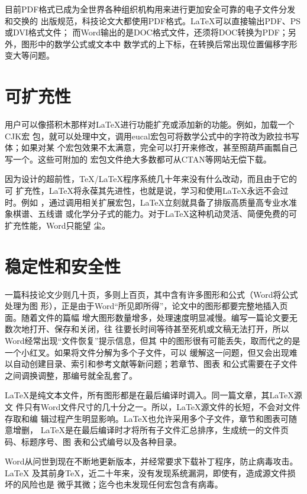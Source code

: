 目前PDF格式已成为全世界各种组织机构用来进行更加安全可靠的电子文件分发和交换的
出版规范，科技论文大都使用PDF格式。\LaTeX{}可以直接输出PDF、PS或DVI格式文件；
而Word输出的是DOC格式文件，还须将DOC转换为PDF；另外，图形中的数学公式或文本中
数学式的上下标，在转换后常出现位置偏移字形变大等问题。

\section*{可扩充性}

用户可以像搭积木那样对\LaTeX{}进行功能扩充或添加新的功能。例如，加载一个CJK宏
包，就可以处理中文，调用eucal宏包可将数学公式中的字符改为欧拉书写体；如果对某
个宏包效果不太满意，完全可以打开来修改，甚至照葫芦画瓢自己写一个。这些可附加的
宏包文件绝大多数都可从CTAN等网站无偿下载。

因为设计的超前性，\TeX{}/\LaTeX{}程序系统几十年来没有什么改动，而且由于它的可
扩充性，\LaTeX{}将永葆其先进性，也就是说，学习和使用\LaTeX{}永远不会过时。例如
，通过调用相关扩展宏包，\LaTeX{}立刻就具备了排版高质量高专业水准象棋谱、五线谱
或化学分子式的能力。对于\LaTeX{}这种机动灵活、简便免费的可扩充性能，Word只能望
尘。

\section*{稳定性和安全性}

一篇科技论文少则几十页，多则上百页，其中含有许多图形和公式（Word将公式处理为图
形），正是由于Word“所见即所得”，论文中的图形都要完整地插入页面。随着文件的篇幅
增大图形数量增多，处理速度明显减慢。编写一篇论文要无数次地打开、保存和关闭，往
往要长时间等待甚至死机或文稿无法打开，所以Word经常出现“文件恢复”提示信息，但其
中的图形很有可能丢失，取而代之的是一个小红叉。如果将文件分解为多个子文件，可以
缓解这一问题，但又会出现难以自动创建目录、索引和参考文献等新问题；若章节、图表
和公式需要在子文件之间调换调整，那编号就全乱套了。

\LaTeX{}是纯文本文件，所有图形都是在最后编译时调入。同一篇文章，其\LaTeX{}源文
件只有Word文件尺寸的几十分之一。所以，\LaTeX{}源文件的长短，不会对文件存取和编
辑过程产生明显影响。\LaTeX{}也允许采用多个子文件，章节和图表可随意增删，
\LaTeX{}是在最后编译时才将所有子文件汇总排序，生成统一的文件页码、标题序号、图
表和公式编号以及各种目录。

Word从问世到现在不断地更新版本，并经常要求下载补丁程序，防止病毒攻击。\LaTeX{}
及其前身\TeX{}，近二十年来，没有发现系统漏洞，即使有，造成源文件损坏的风险也是
微乎其微；迄今也未发现任何宏包含有病毒。

